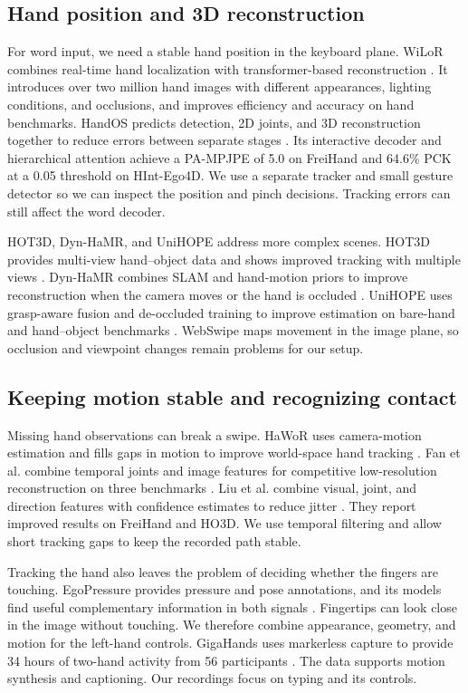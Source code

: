 \documentclass[preprint,12pt]{elsarticle}
\begin{document}
\subsection{Hand position and 3D reconstruction}
For word input, we need a stable hand position in the keyboard plane. WiLoR combines real-time hand localization with transformer-based reconstruction \cite{recent04}. It introduces over two million hand images with different appearances, lighting conditions, and occlusions, and improves efficiency and accuracy on hand benchmarks. HandOS predicts detection, 2D joints, and 3D reconstruction together to reduce errors between separate stages \cite{recent11}. Its interactive decoder and hierarchical attention achieve a PA-MPJPE of 5.0 on FreiHand and 64.6\% PCK at a 0.05 threshold on HInt-Ego4D. We use a separate tracker and small gesture detector so we can inspect the position and pinch decisions. Tracking errors can still affect the word decoder.

HOT3D, Dyn-HaMR, and UniHOPE address more complex scenes. HOT3D provides multi-view hand--object data and shows improved tracking with multiple views \cite{recent05}. Dyn-HaMR combines SLAM and hand-motion priors to improve reconstruction when the camera moves or the hand is occluded \cite{recent06}. UniHOPE uses grasp-aware fusion and de-occluded training to improve estimation on bare-hand and hand--object benchmarks \cite{recent07}. WebSwipe maps movement in the image plane, so occlusion and viewpoint changes remain problems for our setup.

\subsection{Keeping motion stable and recognizing contact}
Missing hand observations can break a swipe. HaWoR uses camera-motion estimation and fills gaps in motion to improve world-space hand tracking \cite{recent09}. Fan et al. combine temporal joints and image features for competitive low-resolution reconstruction on three benchmarks \cite{recent12}. Liu et al. combine visual, joint, and direction features with confidence estimates to reduce jitter \cite{recent15}. They report improved results on FreiHand and HO3D. We use temporal filtering and allow short tracking gaps to keep the recorded path stable.

Tracking the hand also leaves the problem of deciding whether the fingers are touching. EgoPressure provides pressure and pose annotations, and its models find useful complementary information in both signals \cite{recent10}. Fingertips can look close in the image without touching. We therefore combine appearance, geometry, and motion for the left-hand controls. GigaHands uses markerless capture to provide 34 hours of two-hand activity from 56 participants \cite{recent08}. The data supports motion synthesis and captioning. Our recordings focus on typing and its controls.
\end{document}
